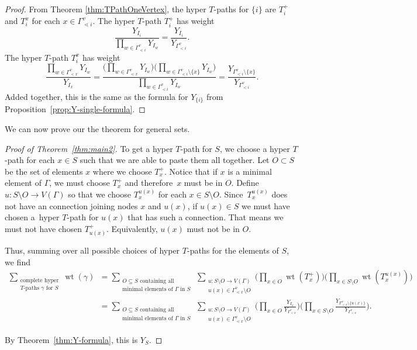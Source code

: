 \documentclass[pdftex]{sigma}
\numberwithin{equation}{section}
\DeclareMathOperator{\wt}{wt}
\begin{document}
\begin{proof}
From Theorem \ref{thm:TPathOneVertex}, the hyper $T$-paths for $\{i\}$ are $T_i^{+}$ and $T_i^x$ for each $x\in\Gamma_{\lessdot i}^v$. The hyper $T$-path $T_i^{+}$ has weight \[ \frac{Y_{I_{i}}}{\prod_{w\in\Gamma_{\lessdot i}^v} Y_{I_{w}}}=\frac{Y_{I_{i}}}{Y_{\Gamma_{< i}^v}}.\]
The hyper $T$-path $T_i^x$ has weight
\[ \frac{\prod_{w \in \Gamma_{\lessdot x}^v} Y_{I_w}}{Y_{I_{x}}} = \frac{\Big(\prod_{w \in \Gamma_{\lessdot x}^v} Y_{I_w}\Big)\Big(\prod_{w\in\Gamma_{\lessdot i}^v\setminus\{x\}} Y_{I_{w}}\Big)}{\prod_{w\in\Gamma_{\lessdot i}^v} Y_{I_{w}}}= \frac{Y_{\Gamma_{< i}^v\setminus\{x\}} }{Y_{\Gamma_{< i}^v}}.\]
Added together, this is the same as the formula for $Y_{\{i\}}$ from Proposition~\ref{prop:Y-single-formula}.
\end{proof}

We can now prove our the theorem for general sets.

\begin{proof}[Proof of Theorem~\ref{thm:main2}]
To get a hyper $T$-path for $S$, we choose a hyper $T$-path for each $x\in S$ such that we are able to paste them all together. Let $O\subset S$ be the set of elements $x$ where we choose $T_x^{+}$. Notice that if $x$ is a minimal element of $\Gamma$, we must choose $T_x^{+}$ and therefore~$x$ must be in $O$. Define $u\colon S\setminus O\to V(\Gamma)$ so that we choose $T_x^{u(x)}$ for each $x\in S\setminus O$. Since~$T_x^{u(x)}$ does not have an connection joining nodes $x$ and $u(x)$, if $u(x)\in S$ we must have chosen a~hyper $T$-path for $u(x)$ that has such a connection. That means we must not have chosen $T_{u(x)}^+$. Equivalently, $u(x)$ must not be in $O$.

Thus, summing over all possible choices of hyper $T$-paths for the elements of $S$, we find
\begin{align*}
\sum_{\substack{\text{complete hyper}\\T\text{-paths }\gamma\text{ for }S}}\wt(\gamma)&=\sum_{\substack{O\subseteq S\text{ containing all}\\ \text{minimal elements of }\Gamma\text{ in }S}} \, \sum_{\substack{u\colon S\setminus O\to V(\Gamma)\\ u(x)\in\Gamma_{\lessdot x}^v\setminus O}}\bigg(\prod_{x\in O}\wt(T_x^{+})\bigg)\bigg(\prod_{x\in S\setminus O}\wt(T_x^{u(x)})\bigg)\\
&=\sum_{\substack{O\subseteq S\text{ containing all}\\ \text{minimal elements of }\Gamma\text{ in }S}} \, \sum_{\substack{u\colon S\setminus O\to V(\Gamma)\\ u(x)\in\Gamma_{\lessdot x}^v\setminus O}}\bigg(\prod_{x\in O}\frac{Y_{I_{x}}}{Y_{\Gamma_{< x}^v}}\bigg)\bigg(\prod_{x\in S\setminus O}\frac{Y_{\Gamma_{< x}^v\setminus\{u(x)\}} }{Y_{\Gamma_{< x}^v}}\bigg).
\end{align*}

By Theorem~\ref{thm:Y-formula}, this is $Y_S$.
\end{proof}
\end{document}
